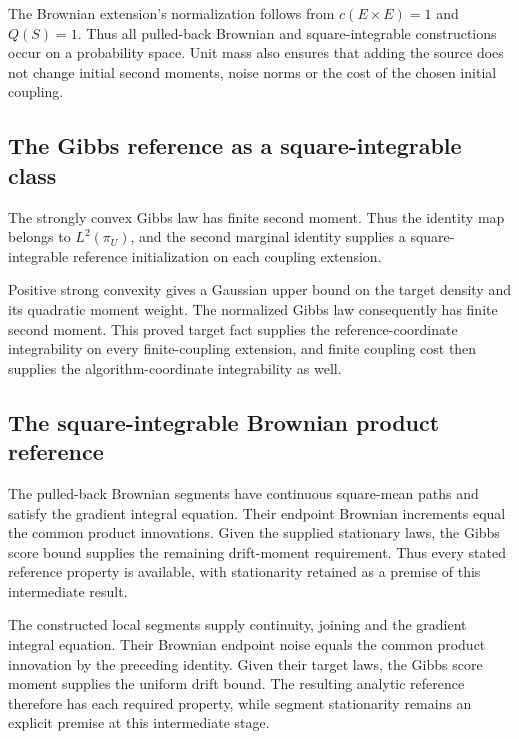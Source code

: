 \documentclass[11pt,a4paper]{report}
\begin{document}
The Brownian extension's normalization follows from \(c(E\times E)=1\) and \(Q(S)=1\). Thus all pulled-back Brownian and square-integrable constructions occur on a probability space. Unit mass also ensures that adding the source does not change initial second moments, noise norms or the cost of the chosen initial coupling.

\subsection{\texorpdfstring{The Gibbs reference as a square-integrable class}{The Gibbs reference as a square-integrable class}}
\label{report-step-UnadjustedLangevin-ProductBrownian-lean-19}


The strongly convex Gibbs law has finite second moment. Thus the identity map belongs to \(L^2(\pi_U)\), and the second marginal identity supplies a square-integrable reference initialization on each coupling extension.



Positive strong convexity gives a Gaussian upper bound on the target density and its quadratic moment weight. The normalized Gibbs law consequently has finite second moment. This proved target fact supplies the reference-coordinate integrability on every finite-coupling extension, and finite coupling cost then supplies the algorithm-coordinate integrability as well.

\subsection{\texorpdfstring{The square-integrable Brownian product reference}{The square-integrable Brownian product reference}}
\label{report-step-UnadjustedLangevin-ProductBrownian-lean-20}


The pulled-back Brownian segments have continuous square-mean paths and satisfy the gradient integral equation. Their endpoint Brownian increments equal the common product innovations. Given the supplied stationary laws, the Gibbs score bound supplies the remaining drift-moment requirement. Thus every stated reference property is available, with stationarity retained as a premise of this intermediate result.



The constructed local segments supply continuity, joining and the gradient integral equation. Their Brownian endpoint noise equals the common product innovation by the preceding identity. Given their target laws, the Gibbs score moment supplies the uniform drift bound. The resulting analytic reference therefore has each required property, while segment stationarity remains an explicit premise at this intermediate stage.
\end{document}
